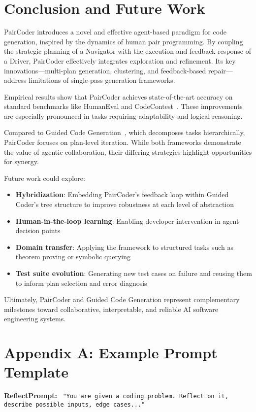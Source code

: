 \documentclass[11pt,a4paper]{article}
\begin{document}
\section{Conclusion and Future Work}
PairCoder introduces a novel and effective agent-based paradigm for code generation, inspired by the dynamics of human pair programming. By coupling the strategic planning of a Navigator with the execution and feedback response of a Driver, PairCoder effectively integrates exploration and refinement. Its key innovations—multi-plan generation, clustering, and feedback-based repair—address limitations of single-pass generation frameworks.

Empirical results show that PairCoder achieves state-of-the-art accuracy on standard benchmarks like HumanEval and CodeContest~\cite{zhang2024paircoder}. These improvements are especially pronounced in tasks requiring adaptability and logical reasoning.

Compared to Guided Code Generation~\cite{almorsi2025guided}, which decomposes tasks hierarchically, PairCoder focuses on plan-level iteration. While both frameworks demonstrate the value of agentic collaboration, their differing strategies highlight opportunities for synergy.

Future work could explore:
\begin{itemize}
  \item \textbf{Hybridization}: Embedding PairCoder’s feedback loop within Guided Coder’s tree structure to improve robustness at each level of abstraction
  \item \textbf{Human-in-the-loop learning}: Enabling developer intervention in agent decision points~\cite{chen2024selfdebugging}
  \item \textbf{Domain transfer}: Applying the framework to structured tasks such as theorem proving or symbolic querying
  \item \textbf{Test suite evolution}: Generating new test cases on failure and reusing them to inform plan selection and error diagnosis
\end{itemize}

Ultimately, PairCoder and Guided Code Generation represent complementary milestones toward collaborative, interpretable, and reliable AI software engineering systems.

\newpage
\appendix
\appendix
\section{Appendix A: Example Prompt Template}
\textbf{ReflectPrompt:} \
\texttt{"You are given a coding problem. Reflect on it, describe possible inputs, edge cases..."}
\end{document}
